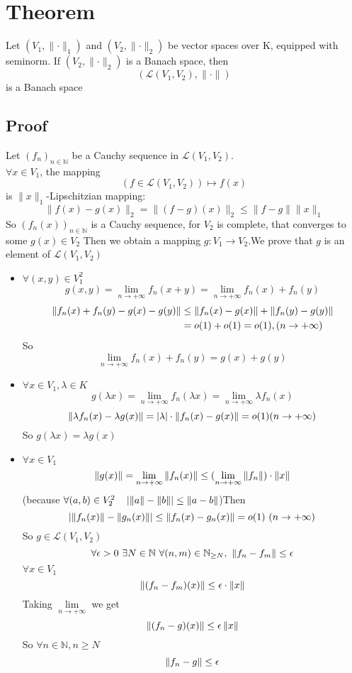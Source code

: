 \documentclass{book}
\newcommand{\abs}[1]{\left\lvert #1 \right\rvert}
\begin{document}
\section{Theorem}
Let $(V_1,\lVert \cdot\rVert _1)$ and $(V_2,\lVert \cdot\rVert _2)$ be vector spaces over K, equipped with seminorm. If $(V_2,\lVert \cdot\rVert _2)$ is a Banach space, then $$(\mathscr{L}(V_1,V_2),\lVert \cdot\rVert)$$ is a Banach space
\subsection*{Proof}
Let $(f_n)_{n\in \mathbb{N}}$ be a Cauchy sequence in $\mathscr{L}(V_1,V_2)$.\\$\forall x\in V_1$, the mapping $$(f\in \mathscr{L}(V_1,V_2))\mapsto f(x)$$ is $\lVert x\rVert _1$-Lipschitzian mapping:
$$\lVert f(x)-g(x)\rVert _2=\lVert (f-g)(x)\rVert _2\leq\lVert f-g\rVert\lVert x\rVert _1$$
So $(f_n(x))_{n\in \mathbb{N}}$ is a Cauchy sequence, for $V_2$ is complete, that converges to some $g(x)\in V_2$
Then we obtain a mapping $g:V_1\rightarrow V_2$.We prove that $g$ is an element of $\mathscr{L}(V_1,V_2)$
\begin{itemize}
    \item $\forall(x,y)\in V_1^2$$$g(x,y)=\lim\limits_{n\rightarrow+\infty}f_n(x+y)=\lim\limits_{n\rightarrow+\infty}f_n(x)+f_n(y)$$
    $$\begin{aligned}
        \lVert f_n(x)+f_n(y)-g(x)-g(y)\rVert &\leq\left\lVert f_n(x)-g(x) \right\rVert+\left\lVert f_n(y)-g(y) \right\rVert\\ &= o(1)+o(1)=o(1),(n\rightarrow+\infty) 
    \end{aligned}$$
    So $$\lim\limits_{n\rightarrow+\infty}f_n(x)+f_n(y)=g(x)+g(y)$$
    \item $\forall x\in V_1,\lambda\in K$
    $$g(\lambda x)=\lim\limits_{n\rightarrow+\infty}f_n(\lambda x)=\lim\limits_{n\rightarrow+\infty}\lambda f_n(x)$$
    $$\norm{\lambda f_n(x)-\lambda g(x)}=\abs{\lambda}\cdot\norm{f_n(x)-g(x)}=o(1) (n\rightarrow+\infty)$$
    So $g(\lambda x)=\lambda g(x)$
    \item $\forall x\in V_1$$$\left\lVert g(x) \right\rVert=\lim\limits_{n\rightarrow+\infty}\left\lVert f_n(x) \right\rVert\leq(\lim\limits_{n\rightarrow+\infty}\left\lVert f_n \right\rVert)\cdot\left\lVert x \right\rVert$$
    (because $\forall(a,b)\in V_2^2\quad\abs{\norm{a}-\norm{b}}\leq\norm{a-b}$)Then 
    $$\abs{\norm{f_n(x)}-\norm{g_n(x)}}\leq\norm{f_n(x)-g_n(x)}=o(1)\ (n\rightarrow+\infty)$$
    So $g\in \mathscr{L}(V_1,V_2)$
    $$\forall\epsilon>0\ \exists N\in \mathbb{N}\ \forall(n,m)\in \mathbb{N}_{\geq N},\ \left\lVert f_n-f_m \right\rVert\leq \epsilon$$
    $\forall x\in V_1$$$\left\lVert (f_n-f_m)(x) \right\rVert\leq\epsilon\cdot\left\lVert x \right\rVert$$
    Taking $\lim\limits_{n\rightarrow+\infty}$ we get 
    $$\left\lVert (f_n-g)(x) \right\rVert\leq\epsilon\left\lVert x \right\rVert$$
    So $\forall n\in \mathbb{N},n\geq N$
    $$\left\lVert f_n-g \right\rVert\leq \epsilon$$
\end{itemize}
\end{document}
